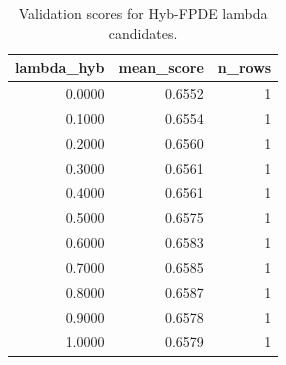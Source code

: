 \begin{table}[t]
\caption{Validation scores for Hyb-FPDE lambda candidates.}
\label{tab:lambda_distribution_computed}
\centering
\begin{tabular}{rrr}
\toprule
lambda\_hyb & mean\_score & n\_rows \\
\midrule
0.0000 & 0.6552 & 1 \\
0.1000 & 0.6554 & 1 \\
0.2000 & 0.6560 & 1 \\
0.3000 & 0.6561 & 1 \\
0.4000 & 0.6561 & 1 \\
0.5000 & 0.6575 & 1 \\
0.6000 & 0.6583 & 1 \\
0.7000 & 0.6585 & 1 \\
0.8000 & 0.6587 & 1 \\
0.9000 & 0.6578 & 1 \\
1.0000 & 0.6579 & 1 \\
\bottomrule
\end{tabular}

\end{table}
